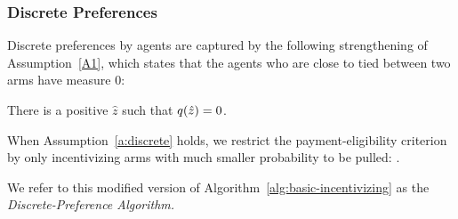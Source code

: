 \subsubsection{Discrete Preferences}
\label{subsec:discrete}
Discrete preferences by agents are captured by the following
strengthening of Assumption~\ref{A1},
which states that the agents who are close to tied between
two arms have measure 0:

\begin{assumption}
\label{a:discrete}
There is a positive $\hat{z}$ such that
$q(\hat{z}) = 0$.
\end{assumption}

When Assumption~\ref{a:discrete} holds,
we restrict the payment-eligibility criterion by only incentivizing
arms with much smaller probability to be pulled:
.



We refer to this modified version of
Algorithm~\ref{alg:basic-incentivizing} as the
\emph{Discrete-Preference Algorithm.}


